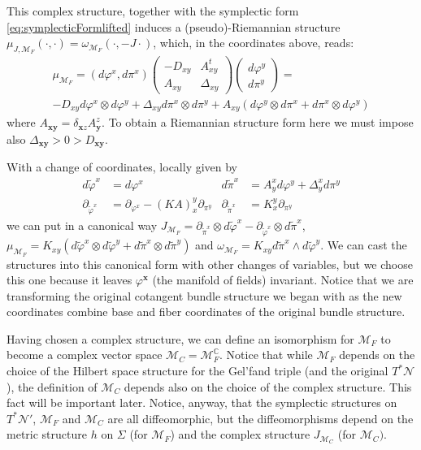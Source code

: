 \documentclass{elsarticle}%
\begin{document}
This complex structure, together with the symplectic form \eqref{eq:symplecticFormlifted} induces a (pseudo)-Riemannian structure $\mu_{J,\mathcal{M}_F}(\cdot,\cdot)=\omega_{\mathcal{M}_F}(\cdot,-J\cdot)$, which, in the coordinates above, reads: 
\begin{multline}
\label{eq:riemannianInduced}
\mu_{\mathcal{M}_F}=(d\varphi^{x},d\pi^{x}) \left( \begin{array}{cc}
    -D_{xy} & A^t_{xy} \\
    A_{xy} & \Delta_{xy}
    \end{array} \right) \left( \begin{array}{c}
        d\varphi^{y} \\
        d\pi^{y}
    \end{array} \right)=\\
    -D_{xy}d\varphi^x\otimes d\varphi^y+\Delta_{xy}d\pi^x\otimes d\pi^y+ A_{xy}(d\varphi^y\otimes d\pi^x+d\pi^x\otimes d\varphi^y)
\end{multline}
where $A_{{\mathbf{x}}{\mathbf{y}}}=\delta_{{\mathbf{x}}z}A^z_{\mathbf{y}}$. To obtain a Riemannian structure form here we must impose also $\Delta_{\mathbf{xy}}>0>D_{\mathbf{xy}}$. 

With a change of coordinates, locally given by
\begin{align}
\label{eq:changeOfCoordinates}
d{\tilde{\varphi}^x}&=d{\varphi^x} &
d{\tilde{\pi}^x}&=A^x_yd{\varphi^y}+\Delta^x_yd{\pi^y} 
\\
\partial_{\tilde{\varphi}^x}&=\partial_{\varphi^x}- (K A)^y_x\partial_{\pi^y} &
\partial_{\tilde{\pi}^x}&=K^y_x\partial_{{\pi}^y}
\end{align}
 we can put in a canonical way $J_{\mathcal{M}_F}=\partial_{\tilde{\pi}^x}\otimes d\tilde{\varphi}^x-\partial_{\tilde{\varphi}^x}\otimes d\tilde{\pi}^x$, $\mu_{\mathcal{M}_F}=K_{xy}(d\tilde{\varphi}^x\otimes d\tilde{\varphi}^y+d\tilde{\pi}^x\otimes d\tilde{\pi}^y)$ and $\omega_{\mathcal{M}_F}=K_{xy} d\tilde{\pi}^x\wedge d\tilde{\varphi}^y$. We  can cast the structures into this canonical form with other changes of variables, but we choose this one because it leaves $\varphi^\mathbf{x}$ (the manifold of fields) invariant. Notice that we are transforming the original cotangent bundle structure we began with as the new coordinates combine base and fiber coordinates of the original bundle structure.

Having chosen a complex structure, we can define an isomorphism for $\mathcal{M}_F$ to become a complex vector space $\mathcal{M}_C=\mathcal{M}_F^{\mathbb{C}}$. Notice that while $\mathcal{M}_F$ depends on the choice of the Hilbert space structure for the Gel'fand triple (and the original $T^*\mathcal{N}$), the definition of $\mathcal{M}_C$ depends also on the choice of the complex structure.  This fact will be important later. Notice, anyway, that the symplectic structures on $T^*\mathcal{N}'$, $\mathcal{M}_F$ and $\mathcal{M}_C$ are all diffeomorphic, but the diffeomorphisms depend on the metric structure $h$ on $\Sigma$ (for $\mathcal{M}_F$)  and the complex structure $J_{\mathcal{M}_C}$ (for $\mathcal{M}_C)$. 
\end{document}

